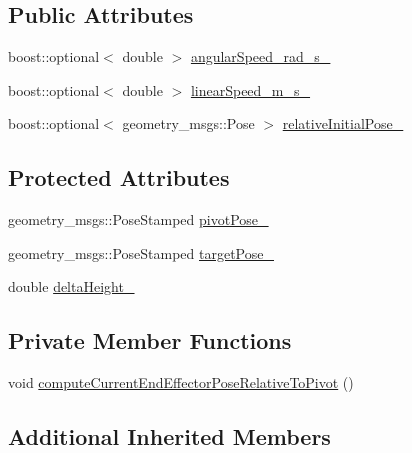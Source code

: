 \subsection*{Public Attributes}
\begin{DoxyCompactItemize}
\item 
boost\+::optional$<$ double $>$ \hyperlink{classcl__move__group__interface_1_1CbCircularPouringMotion_a7f69b3f95281fc14902117d637b59972}{angular\+Speed\+\_\+rad\+\_\+s\+\_\+}
\item 
boost\+::optional$<$ double $>$ \hyperlink{classcl__move__group__interface_1_1CbCircularPouringMotion_ac78ce543451cbb78c95862dd4273deb7}{linear\+Speed\+\_\+m\+\_\+s\+\_\+}
\item 
boost\+::optional$<$ geometry\+\_\+msgs\+::\+Pose $>$ \hyperlink{classcl__move__group__interface_1_1CbCircularPouringMotion_ab6323315364e1f8bc60cbad3daa72fa9}{relative\+Initial\+Pose\+\_\+}
\end{DoxyCompactItemize}
\subsection*{Protected Attributes}
\begin{DoxyCompactItemize}
\item 
geometry\+\_\+msgs\+::\+Pose\+Stamped \hyperlink{classcl__move__group__interface_1_1CbCircularPouringMotion_a58ce9c29e4ef8f09a7569d6d8f9df56b}{pivot\+Pose\+\_\+}
\item 
geometry\+\_\+msgs\+::\+Pose\+Stamped \hyperlink{classcl__move__group__interface_1_1CbCircularPouringMotion_a23f3e511fbb975b090aa96873f18700a}{target\+Pose\+\_\+}
\item 
double \hyperlink{classcl__move__group__interface_1_1CbCircularPouringMotion_a7009d617bcd8ac1fba49100444434f3c}{delta\+Height\+\_\+}
\end{DoxyCompactItemize}
\subsection*{Private Member Functions}
\begin{DoxyCompactItemize}
\item 
void \hyperlink{classcl__move__group__interface_1_1CbCircularPouringMotion_a4986b396e0ba318a0046feea3f6eede6}{compute\+Current\+End\+Effector\+Pose\+Relative\+To\+Pivot} ()
\end{DoxyCompactItemize}
\subsection*{Additional Inherited Members}


